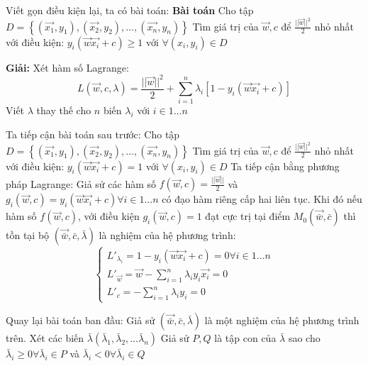 \documentclass{article}
\begin{document}
\begin{enumerate}
        Viết gọn điều kiện lại, ta có bài toán:\newline 
        \textbf{Bài toán} Cho tập $D =\left \{  (\vec{x_1},y_1), (\vec{x_2}, y_2), \dots, (\vec{x_n}, y_n) \right \}$ \newline 
        Tìm giá trị của $\vec{w}, c$ để $\frac{||\vec{w}||^{2}}{2}$ nhỏ nhất với điều kiện: 
        $y_i(\vec{w}\vec{x_i} + c) \geq 1$ \newline 
        với $\forall (x_i, y_i) \in D$ \newline 

        \textbf{Giải: } \newline 
        Xét hàm số Lagrange:
        $$L(\vec{w}, c, \lambda) = \frac{||\vec{w}||^{2}}{2} + \sum_{i=1}^{n}{\lambda _i[1 - y_i(\vec{w}\vec{x_i} + c)]}$$
        Viết $\lambda$ thay thế cho $n$ biến $\lambda _i$ với $i \in 1 \dots n$ \newline 


        Ta tiếp cận bài toán sau trước: \newline 
        Cho tập $D =\left \{  (\vec{x_1},y_1), (\vec{x_2}, y_2), \dots, (\vec{x_n}, y_n) \right \}$ \newline 
        Tìm giá trị của $\vec{w}, c$ để $\frac{||\vec{w}||^{2}}{2}$ nhỏ nhất với điều kiện: 
        $y_i(\vec{w}\vec{x_i} + c) = 1$ \newline 
        với $\forall (x_i, y_i) \in D$ \newline
        Ta tiếp cận bằng phương pháp Lagrange: \newline 
        Giả sử các hàm số 
        $f(\vec{w},c) = \frac{||\vec{w}||}{2} $ và $g_i(\vec{w},c) = y_i(\vec{w}\vec{x_i} + c) \forall i \in 1 \dots n$ 
        có đạo hàm riêng
        cấp hai liên tục. Khi đó nếu hàm số $f(\vec{w},c)$, với điều kiện $g_i(\vec{w},c) = 1$ đạt cực trị tại điểm 
        $M_0(\vec{\bar{w}},\bar{c})$ thì tồn tại bộ $(\vec{\bar{w}}, \bar{c}, \bar{\lambda})$ là nghiệm của hệ phương trình:
        $$
        \left\{\begin{matrix}
            L'_{\lambda _i} = 1 - y_i(\vec{w}\vec{x_i} + c) = 0 \forall i \in 1 \dots n\\
            L'_{\vec{w}} = \vec{w} - \sum_{i=1}^{n}{\lambda _i y_i \vec{x_i}} = 0 \\
            L'_c = -\sum_{i=1}^{n}{\lambda _i y_i} = 0
        \end{matrix}\right.$$
        
        Quay lại bài toán ban đầu: \newline 
        Giả sử $(\vec{\bar{w}}, \bar{c}, \bar{\lambda})$ là một nghiệm của hệ phương trình trên. \newline 
        Xét các biến $\bar{\lambda}(\bar{\lambda} _1, \bar{\lambda} _2, \dots \bar{\lambda} _n)$ \newline 
        Giả sử $P, Q$ là tập con của $\bar{\lambda}$ sao cho $\bar{\lambda}_i \geq 0 \forall \bar{\lambda}_i \in P$
        và $\bar{\lambda}_i < 0 \forall \bar{\lambda}_i \in Q$
        

\end{enumerate}
\end{document}
